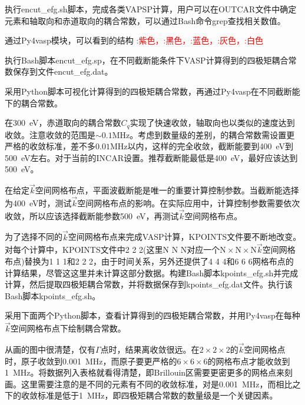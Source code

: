 执行\textrm{encut\_efg.sh}脚本，完成各类\textrm{VAPSP}计算，用户可以在\textrm{OUTCAR}文件中确定元素和轴取向和赤道取向的耦合常数，可以通过\textrm{Bash}命令\textrm{grep}查找相关数值。

通过\textrm{Py4vasp}模块，可以看到的结构
\textcolor{red}{:紫色，:黑色，:蓝色，:灰色，:白色}

执行\textrm{Bash}脚本\textrm{encut\_efg.sp}，在不同截断能条件下\textrm{VASP}计算得到的四极矩耦合常数保存到文件\textrm{encut\_efg.dat}。

采用\textrm{Python}脚本可视化计算得到的四极矩耦合常数，再通过\textrm{Py4vasp}在不同截断能下的耦合常数。

在\textrm{300~eV}，赤道取向的耦合常数$C_q$实现了快速收敛，轴取向也以类似的速度达到收敛。注意收敛的范围是$\sim0.1\mathrm{MHz}$。考虑到数量级的差别，的耦合常数需设置更严格的收敛标准，差不多$0.01\mathrm{MHz}$以内，这样的完全收敛，截断能要到\textrm{400~eV}到\textrm{500~eV}左右。对于当前的\textrm{INCAR}设置。推荐截断能最低是\textrm{400~eV}，最好应该达到\textrm{500~eV}。

在给定$\vec k$空间网格布点，平面波截断能是唯一的重要计算控制参数。当截断能选择为\textrm{400~eV}时，测试$\vec k$空间网格布点的影响。在实际应用中，计算控制参数需要依次收敛，所以应该选择截断能参数\textrm{500~eV}，再测试$\vec k$空间网格布点。

为了选择不同的$\vec k$空间网格布点来完成\textrm{VASP}计算，\textrm{KPOINTS}文件要不断地改变。对每个计算中，\textrm{KPOINTS}文件中2 2 2(这里N N N对应一个$\mathrm{N}\times\mathrm{N}\times\mathrm{N}$$\vec k$空间网格布点)替换为1 1 1和2 2 2，由于时间关系，另外还提供了4 4 4和6 6 6网格布点的计算结果，尽管这这里并未计算这部分数据。构建\textrm{Bash}脚本\textrm{kpoints\_efg.sh}并完成计算，然后提取四极矩耦合常数，并将数据保存到\textrm{kpoints\_efg.dat}文件。执行该\textrm{Bash}脚本\textrm{kpoints\_efg.sh}。

采用下面两个\textrm{Python}脚本，查看计算得到的四极矩耦合常数，并用\textrm{Py4vasp}在每种$\vec k$空间网格布点下绘制耦合常数。

从画的图中很清楚，仅有$\Gamma$点时，结果离收敛很远。在$2\times2\times2$的$\vec k$空间网格点时，原子收敛到\textrm{0.001~MHz}，而原子要更严格的$6\times6\times6$的网格布点才能收敛到\textrm{1~MHz}。将数据列入表格就看得清楚，即\textrm{Brillouin}区需要更密更多的网格点来刻画。这里需要注意的是不同的元素有不同的收敛标准，对是\textrm{0.001~MHz}，而相比之下的收敛标准是低于\textrm{1~MHz}，即四极矩耦合常数的数量级是一个关键因素。

